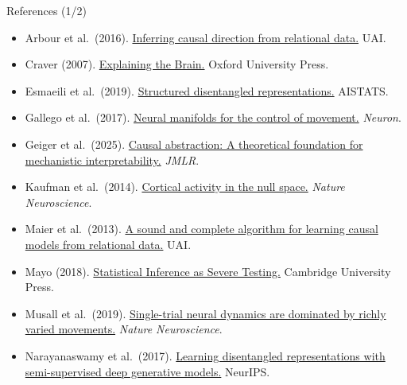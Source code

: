 \documentclass[aspectratio=169,11pt]{beamer}
\begin{document}
\begin{frame}{References (1/2)}
\vspace{-0.3em}
{\scriptsize
\begin{itemize}\setlength\itemsep{0pt}
  \item Arbour et al.\ (2016). \href{https://www.auai.org/uai2016/proceedings/papers/217.pdf}{Inferring causal direction from relational data.} UAI.
  \item Craver (2007). \href{https://doi.org/10.1093/acprof:oso/9780199299317.001.0001}{Explaining the Brain.} Oxford University Press.
  \item Esmaeili et al.\ (2019). \href{https://proceedings.mlr.press/v89/esmaeili19a}{Structured disentangled representations.} AISTATS.
  \item Gallego et al.\ (2017). \href{https://doi.org/10.1038/nn.4510}{Neural manifolds for the control of movement.} \textit{Neuron}.
  \item Geiger et al.\ (2025). \href{https://arxiv.org/abs/2301.04709}{Causal abstraction: A theoretical foundation for mechanistic interpretability.} \textit{JMLR}.
  \item Kaufman et al.\ (2014). \href{https://doi.org/10.1038/nn.3643}{Cortical activity in the null space.} \textit{Nature Neuroscience}.
  \item Maier et al.\ (2013). \href{https://arxiv.org/abs/1309.6843}{A sound and complete algorithm for learning causal models from relational data.} UAI.
  \item Mayo (2018). \href{https://doi.org/10.1017/9781107286184}{Statistical Inference as Severe Testing.} Cambridge University Press.
  \item Musall et al.\ (2019). \href{https://doi.org/10.1038/s41593-019-0502-4}{Single-trial neural dynamics are dominated by richly varied movements.} \textit{Nature Neuroscience}.
  \item Narayanaswamy et al.\ (2017). \href{https://arxiv.org/abs/1706.00400}{Learning disentangled representations with semi-supervised deep generative models.} NeurIPS.
\end{itemize}
}
\end{frame}
\end{document}
